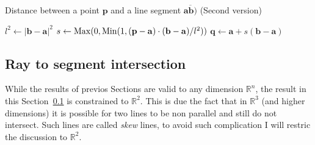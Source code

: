 {\centering
\begin{minipage}{\linewidth}
  \begin{algorithm}[H]
    \caption{Distance between a point $\mathbf{p}$ and a line segment $\overline{\mathbf{a}\mathbf{b})}$  (Second version)}
    \label{alg:poin2seg2}
    \begin{algorithmic}[1] %
       
        \State $l^2 \gets |\mathbf{b} - \mathbf{a}|^2$
         
          \State {}
        \EndIf
        \State $s \gets \operatorname{Max}(0, \operatorname{Min}(1, (\mathbf{p}-\mathbf{a})\cdot(\mathbf{b}-\mathbf{a}) / l^2))$ 
        \State $\mathbf{q} \gets \mathbf{a} + s (\mathbf{b} - \mathbf{a})$
        \State {}
      \EndProcedure
    \end{algorithmic}
  \end{algorithm}
\end{minipage}
\par
}

{\centering
\begin{minipage}{\linewidth}
\end{minipage}
\par
}

\subsection{Ray to segment intersection}
\label{sec:ray2segment}
While the results of previos Sections are valid to any dimension $\mathbb{R}^n$, the result in this Section~\ref{sec:ray2segment} is constrained to $\mathbb{R}^2$.
This is due the fact that in $\mathbb{R}^3$ (and higher dimensions) it is possible for two lines to be non parallel and still do not intersect.
Such lines are called \emph{skew} lines, to avoid such complication I will restric the discussion to $\mathbb{R}^2$.

